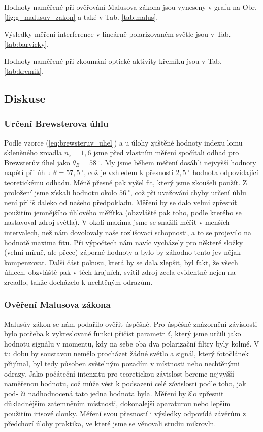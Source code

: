 \documentclass[english]{article}
\begin{document}
		Hodnoty naměřené při ověřování Malusova zákona jsou vyneseny v grafu na Obr. \ref{fig:g_malusuv_zakon} a také v Tab. \ref{tab:malus}. 

		Výsledky měření interference v lineárně polarizovaném světle jsou v Tab. \ref{tab:barvicky}. 
		
		Hodnoty naměřené při zkoumání optické aktivity křemíku jsou v Tab. \ref{tab:kremik}.

	\subsection{Diskuse}
			\subsubsection{Určení Brewsterova úhlu}
				Podle vzorce (\ref{eq:brewsteruv_uhel}) a u úlohy zjištěné hodnoty indexu lomu skleněného zrcadla $n_{z}=1,6$ jsme před vlastním měření spočítali odhad pro Brewsterův úhel jako $\theta_B=58~^\circ$. My jsme během měření dosáhli nejvyšší hodnoty napětí při úhlu $\theta=57,5~^\circ$, což je vzhledem k přesnosti $2,5~^\circ$ hodnota odpovídající teoretickému odhadu. Méně přesně pak vyšel fit, který jsme zkoušeli použít. Z proložení jsme získali hodnotu okolo $56~^\circ$, což při uvažování chyby určení úhlu není příliš daleko od našeho předpokladu. Měření by se dalo velmi zpřesnit použitím jemnějšího úhlového měřítka (obzvláště pak toho, podle kterého se nastavoval zdroj světla). V okolí maxima jsme se snažili měřit v menších intervalech, než nám dovolovaly naše rozlišovací schopnosti, a to se projevilo na hodnotě maxima fitu. Při výpočtech nám navíc vycházely pro některé složky (velmi mírně, ale přece) záporné hodnoty a bylo by záhodno tento jev nějak kompenzovat. Další část pokusu, která by se dala zlepšit, byl fakt, že všech úhlech, obzvláště pak v těch krajních, svítil zdroj zcela evidentně nejen na zrcadlo, takže docházelo k nechtěným odrazům.
				
			\subsubsection{Ověření Malusova zákona}
				Malusův zákon se nám podařilo ověřit úspěšně. Pro úspěšné znázornění závislosti bylo potřeba k vykreslované funkci přičíst parametr $\delta$, který jsme určili jako hodnotu signálu v momentu, kdy na sebe oba dva polarizační filtry byly kolmé. V tu dobu by soustavou nemělo procházet žádné světlo a signál, který fotočlánek přijímal, byl tedy působen světelným pozadím v místnosti nebo nechtěnými odrazy. Jako počáteční intenzitu pro teoretickou závislost bereme nejvyšší naměřenou hodnotu, což může vést k podsazení celé závislosti podle toho, jak pod- či nadhodnocená tato jedna hodnota byla. Měření by šlo zpřesnit důkladnějším zatemněním místnosti, dokonalejší aparaturou nebo lepším použitím irisové clonky. Měření svou přesností i výsledky odpovídá závěrům z předchozí úlohy praktika, ve které jsme se věnovali studiu mikrovln.
				
\end{document}
